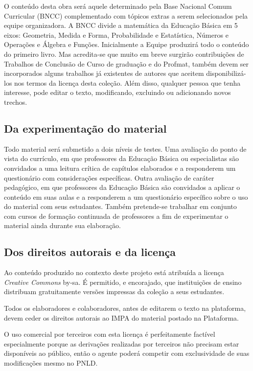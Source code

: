 \documentclass[10 pt]{article}
\begin{document}
O conteúdo desta obra será aquele determinado pela Base Nacional Comum Curricular (BNCC) complementado com tópicos extras a serem selecionados pela equipe organizadora.
A BNCC divide a matemática da Educação Básica em 5 eixos: Geometria, Medida e Forma, Probabilidade e Estatística, Números e Operações e Álgebra e Funções.
Inicialmente a Equipe produzirá todo o conteúdo do primeiro livro.
Mas acredita-se que muito em breve surgirão contribuições de Trabalhos de Conclusão de Curso de graduação e do Profmat, também devem ser incorporados alguns trabalhos já existentes de autores que aceitem disponibilizá-los nos termos da licença desta coleção.
Além disso, qualquer pessoa que tenha interesse, pode editar o texto, modificando, excluindo ou adicionando novos trechos.

\subsection{Da experimentação do material}


Todo material será submetido a dois níveis de testes. 
Uma avaliação do ponto de vista do currículo, em que professores da Educação Básica ou especialistas são convidados a uma leitura crítica de capítulos elaborados e a responderem um questionário com considerações específicas. 
Outra avaliação de caráter pedagógico, em que professores da Educação Básica são convidados a aplicar o conteúdo em suas aulas e a responderem a um questionário específico sobre o uso do material com seus estudantes. Também pretende-se trabalhar em conjunto com cursos de formação continuada de professores a fim de experimentar o material ainda durante sua elaboração.

\subsection{Dos direitos autorais e da licença}

Ao conteúdo produzido no contexto deste projeto está atribuída a licença {\it Creative Commons} by-sa.
É permitido, e encorajado, que instituições de ensino distribuam gratuitamente versões impressas da coleção a seus estudantes. 

Todos os elaboradores e colaboradores, antes de editarem o texto na plataforma, devem ceder os direitos autorais ao IMPA do material postado na Plataforma.

O uso comercial por terceiros com esta licença é perfeitamente factível especialmente porque as derivações realizadas por terceiros não precisam estar disponíveis ao público, então o agente poderá competir com exclusividade de suas modificações mesmo no PNLD.
\end{document}
